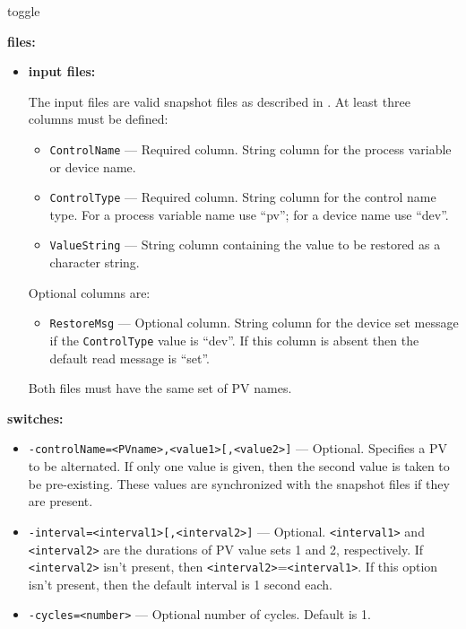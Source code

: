\begin{sddsprog}{toggle}
\item \textbf{files:}
\begin{itemize}
  \item \textbf{input files:}\par
The input files are valid snapshot files as described in . At least three
columns must be defined:
  \begin{itemize}
    \item {\tt ControlName} --- Required column. String column for the process variable or device name.
    \item {\tt ControlType} --- Required column. String column for the control name type. For a
                process variable name use ``pv''; for a device name use ``dev''.
    \item {\tt ValueString} --- String column containing the value to be restored as a character string.
  \end{itemize}
Optional columns are:
  \begin{itemize}
    \item {\tt RestoreMsg} --- Optional column. String column for the device set message if
                the {\tt ControlType} value is ``dev''.
                If this column is absent then the default read message is ``set''.
  \end{itemize}
        Both files must have the same set of PV names.
\end{itemize}
\item \textbf{switches:}
\begin{itemize}
  \item {\tt -controlName=<PVname>,<value1>[,<value2>]} --- Optional. Specifies a PV to be
                alternated. If only one value is given, then the second value
                is taken to be pre-existing. These values are synchronized with
                the snapshot files if they are present.
  \item {\tt -interval=<interval1>[,<interval2>]} ---  Optional. \verb+<interval1>+ and \verb+<interval2>+
                 are the durations of PV value sets 1 and 2, respectively.
                 If \verb+<interval2>+ isn't present, then \verb+<interval2>+=\verb+<interval1>+.
                 If this option isn't present, then the default interval is 1 second each.
  \item {\tt -cycles=<number>} --- Optional number of cycles. Default is 1.

\end{itemize}
\end{sddsprog}
